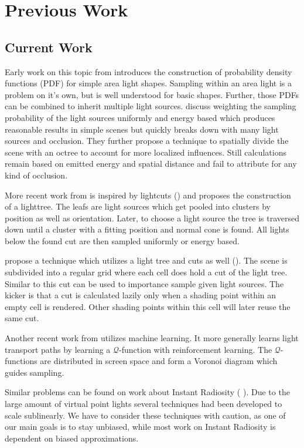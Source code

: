 \chapter{Previous Work}
\label{ch:Prev}

\section{Current Work}

Early work on this topic from \cite{Shirley:1996:MCT:226150.226151} introduces the construction of probability density functions (PDF) for simple area light shapes. Sampling within an area light is a problem on it's own, but is well understood for basic shapes. Further, those PDFs can be combined to inherit multiple light sources. \cite{Shirley:1996:MCT:226150.226151} discuss weighting the sampling probability of the light sources uniformly and energy based which produces reasonable results in simple scenes but quickly breaks down with many light sources and occlusion. They further propose a technique to spatially divide the scene with an octree to account for more localized influences. Still calculations remain based on emitted energy and spatial distance and fail to attribute for any kind of occlusion.

More recent work from \cite{Estevez:2017:ISM:3084363.3085028} is inspired by lightcuts (\cite{Walter2005LightcutsAS}) and proposes the construction of a lighttree. The leafs are light sources which get pooled into clusters by position as well as orientation. Later, to choose a  light source the tree is traversed down until a cluster with a fitting position and normal cone is found. All lights below the found cut are then sampled uniformly or energy based.

\cite{Vevoda:2016:ADI:3005274.3005283} propose a technique which utilizes a light tree and cuts as well (\cite{Walter2005LightcutsAS}). The scene is subdivided into a regular grid where each cell does hold a cut of the light tree. Similar to \cite{Estevez:2017:ISM:3084363.3085028} this cut can be used to importance sample given light sources. The kicker is that a cut is calculated lazily only when a shading point within an empty cell is rendered. Other shading points within this cell will later reuse the same cut.

Another recent work from \cite{DBLP:journals/corr/DahmK17} utilizes machine learning. It more generally learns light transport paths by learning a $\mathcal{Q}$-function with reinforcement learning. The $\mathcal{Q}$-functions are distributed in screen space and form a Voronoi diagram which guides sampling.

Similar problems can be found on work about Instant Radiosity (\cite{keller1997instant} \cite{Walter2005LightcutsAS} \cite{dachsbacher2014scalable}). Due to the large amount of virtual point lights several techniques had been developed to scale sublinearly. We have to consider these techniques with caution, as one of our main goals is to stay unbiased, while most work on Instant Radiosity is dependent on biased approximations.
